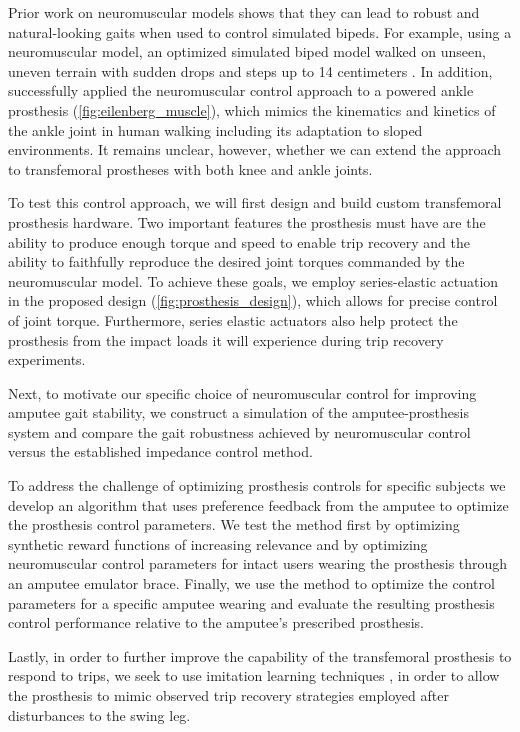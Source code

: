 Prior work on neuromuscular models shows that they can lead to robust and
natural-looking gaits when used to control simulated bipeds. For example, using
a neuromuscular model, an optimized simulated biped model walked on unseen,
uneven terrain with sudden drops and steps up to 14 centimeters
\citep{song2015neural}. In addition, \citet{eilenberg2010control} successfully
applied the neuromuscular control approach to a powered ankle prosthesis
(\cref{fig:eilenberg_muscle}), which mimics the kinematics and kinetics of the
ankle joint in human walking including its adaptation to sloped environments. It
remains unclear, however, whether we can extend the approach to transfemoral
prostheses with both knee and ankle joints.

To test this control approach, we will first design and build custom
transfemoral prosthesis hardware. Two important features the prosthesis must
have are the ability to produce enough torque and speed to enable trip recovery
and the ability to faithfully reproduce the desired joint torques commanded by
the neuromuscular model. To achieve these goals, we employ series-elastic
actuation~\citep{pratt1995series} in the proposed design
(\cref{fig:prosthesis_design}), which allows for precise control of joint
torque. Furthermore, series elastic actuators also help protect the prosthesis
from the impact loads it will experience during trip recovery experiments. 

Next, to motivate our specific choice of neuromuscular control for improving
amputee gait stability, we construct a simulation of the amputee-prosthesis
system and compare the gait robustness achieved by neuromuscular control versus
the established impedance control method.

To address the challenge of optimizing prosthesis controls for specific subjects
we develop an algorithm that uses preference feedback from the amputee to
optimize the prosthesis control parameters. We test the method first by
optimizing synthetic reward functions of increasing relevance and by optimizing
neuromuscular control parameters for intact users wearing the prosthesis through
an amputee emulator brace. Finally, we use the method to optimize the control
parameters for a specific amputee wearing and evaluate the resulting prosthesis
control performance relative to the amputee's prescribed prosthesis.

Lastly, in order to further improve the capability of the transfemoral
prosthesis to respond to trips, we seek to use imitation learning techniques
\citep{argall2009survey}, in order to allow the prosthesis to mimic observed
trip recovery strategies employed after disturbances to the swing leg.

